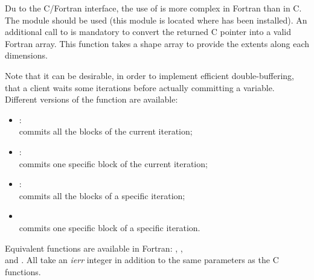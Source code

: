 \noindent\begin{minipage}{\textwidth}
\vspace{0.5cm}

\end{minipage}

\noindent\begin{minipage}{\textwidth}

\end{minipage}

Du to the C/Fortran interface, the use of  is more complex in Fortran than in C.
The \Damaris{} module should be used (this module is located where \Damaris{} has been installed). 
An additional call to  is mandatory to convert the returned C pointer
into a valid Fortran array. This function takes a shape array to provide the extents along each dimensions.

Note that it can be desirable,
in order to implement efficient double-buffering, that a client waits some iterations before actually committing 
a variable. Different versions of the function are available:
\begin{itemize}
\item {} : \\ commits all the blocks of the current iteration;
\item {} : \\ commits one specific block of the current iteration;
\item {} : \\ commits all the blocks of a specific iteration;
\item {} \\ commits one specific block of a specific iteration.
\end{itemize}

Equivalent functions are available in Fortran: ,
,\\  and .
All take an \emph{ierr} integer in addition to the same parameters as the C functions.

